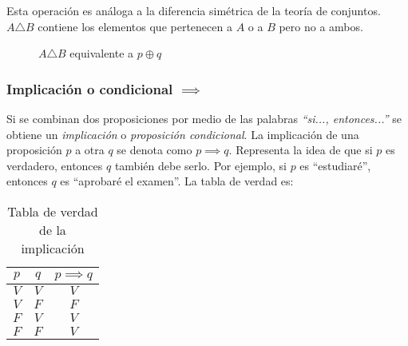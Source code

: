 Esta operación es análoga a la diferencia simétrica de la teoría de conjuntos. $A \triangle B$ contiene los elementos que pertenecen a $A$ o a $B$ pero no a ambos.

\begin{figure}[h]
	\centering
	\caption*{$A \triangle B$ equivalente a $p \oplus q$}
\end{figure}


\subsubsection{Implicación o condicional $\implies$}
Si se combinan dos proposiciones por medio de las palabras \textit{``si..., entonces...''} se obtiene un \textit{implicación} o \textit{proposición condicional}. La implicación de una proposición $p$ a otra $q$ se denota como $p \implies q$. Representa la idea de que si $p$ es verdadero, entonces $q$ también debe serlo. Por ejemplo, si $p$ es ``estudiaré'', entonces $q$ es ``aprobaré el examen''. La tabla de verdad es:

\begin{table}[H]
	\centering
	\begin{tabular}{|c|c|c|} \hline
		$p$ & $q$ & $p \implies q$ \\ \hline
		$V$ & $V$ & $V$ \\
		$V$ & $F$ & $F$ \\
		$F$ & $V$ & $V$ \\
		$F$ & $F$ & $V$ \\ \hline
	\end{tabular}
	\caption{Tabla de verdad de la implicación}
	\label{tab:implicacion}
\end{table}

